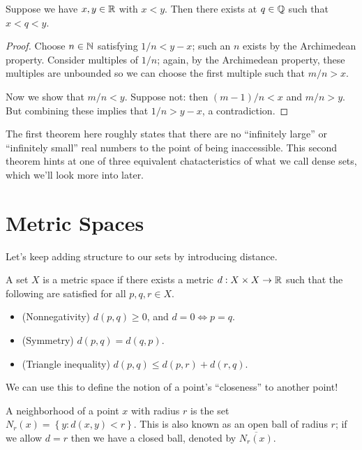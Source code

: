 \documentclass[../m131main.tex]{subfiles}
\begin{document}
\pagebreak

\begin{theorem}[$\Q$ is dense in $\R$]
    Suppose we have $x,y \in \mathbb{R}$ with $x < y$. Then there exists at $q \in \mathbb{Q}$ such that $x < q < y$.
\end{theorem}

\begin{proof}
    Choose $n \in \mathbb{N}$ satisfying $1 / n < y - x$; such an $n$ exists by the Archimedean property.
    Consider multiples of $1 / n$; again, by the Archimedean property, these multiples are unbounded so we can choose the first multiple such that $m / n > x$.

    Now we show that $m / n < y$.
    Suppose not: then $(m-1) / n < x$ and $m / n > y$.
    But combining these implies that $1 / n > y - x$, a contradiction.
\end{proof}

The first theorem here roughly states that there are no ``infinitely large'' or ``infinitely small'' real numbers to the point of being inaccessible.
This second theorem hints at one of three equivalent chatacteristics of what we call dense sets, which we'll look more into later.

\section{Metric Spaces}
Let's keep adding structure to our sets by introducing distance.

\begin{definition}
    A set $X$ is a metric space if there exists a metric $d : X \times X \to \mathbb{R}$ such that the following are satisfied for all $p,q,r \in X$.
    \begin{itemize}
        \item (Nonnegativity) $d(p,q) \geq 0$, and $d = 0 \iff p = q$.
        \item (Symmetry) $d(p,q) = d(q,p)$.
        \item (Triangle inequality) $d(p,q) \leq d(p,r) + d(r,q)$.
    \end{itemize}
\end{definition}

We can use this to define the notion of a point's ``closeness'' to another point!

\begin{definition}[Neighborhood]
    A neighborhood of a point $x$ with radius $r$ is the set $N_r(x) = \left\{ y : d(x,y) < r \right\}$.
    This is also known as an open ball of radius $r$; if we allow $d = r$ then we have a closed ball, denoted by $\overline{N_r(x)}$.
\end{definition}
\end{document}
